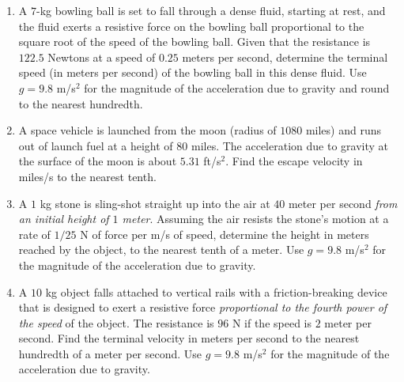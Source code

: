 \documentclass{ximera}
\begin{document}
\begin{enumerate}[label=(\arabic*)]




\item A $7$-kg bowling ball is set to fall through a dense fluid, starting at rest, and the fluid exerts a resistive force on the bowling ball proportional to the square root of the speed of the bowling ball.  Given that the resistance is $122.5$ Newtons at a speed of $0.25$ meters per second, determine the terminal speed (in meters per second) of the bowling ball in this dense fluid.  Use $g=9.8$ m/s$^2$ for the magnitude of the acceleration due to gravity and round to the nearest hundredth.\\





\item  A space vehicle is launched from the moon (radius of $1080$ miles) and runs out of launch fuel at a height of 80 miles. The acceleration due to gravity at the surface of the moon is about $5.31$ ft/s$^2$. Find the escape velocity in miles/s to the nearest tenth. 



\item A $1$ kg stone is sling-shot straight up into the air at $40$ meter per second \emph{from an initial height of $1$ meter}.  Assuming the air resists the stone's motion at a rate of $1/25$ N of force per m/s of speed, determine the height in meters reached by the object, to the nearest tenth of a meter.  Use $g=9.8$ m/s$^2$ for the magnitude of the acceleration due to gravity.\\






\item  A $10$ kg object falls attached to vertical rails with a friction-breaking device that is designed to exert a resistive force \emph{proportional to the fourth power of the speed} of the object.  The resistance is $96$ N if the speed is $2$ meter per second.  Find the terminal velocity in meters per second to the nearest hundredth of a meter per second.  Use $g=9.8$ m/s$^2$ for the magnitude of the acceleration due to gravity.\\


\end{enumerate}
\end{document}
